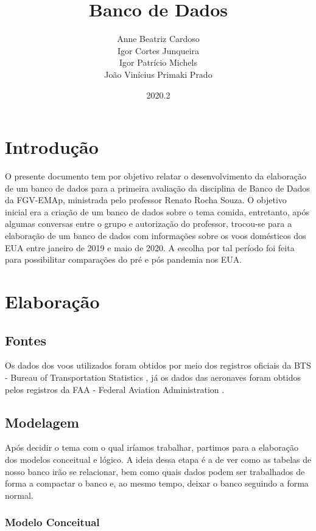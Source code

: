 \documentclass{article}
\title{Banco de Dados}
\author{Anne Beatriz Cardoso \\ Igor Cortes Junqueira \\ Igor Patrício Michels \\ João Vinícius Primaki Prado}
\date{2020.2}
\begin{document}
	
	\maketitle
	
	\section{Introdução}
	
	O presente documento tem por objetivo relatar o desenvolvimento da elaboração de um banco de dados para a primeira avaliação da disciplina de Banco de Dados da FGV-EMAp, ministrada pelo professor Renato Rocha Souza. O objetivo inicial era a criação de um banco de dados sobre o tema comida, entretanto, após algumas conversas entre o grupo e autorização do professor, trocou-se para a elaboração de um banco de dados com informações sobre os voos domésticos dos EUA entre janeiro de 2019 e maio de 2020. A escolha por tal período foi feita para possibilitar comparações do pré e pós pandemia nos EUA.
	
	\section{Elaboração}
	
	\subsection{Fontes}
	
	Os dados dos voos utilizados foram obtidos por meio dos registros oficiais da BTS - Bureau of Transportation Statistics \cite{BTS}, já os dados das aeronaves foram obtidos pelos registros da FAA - Federal Aviation Administration \cite{FAA}.
	
	\subsection{Modelagem}
	
	Após decidir o tema com o qual iríamos trabalhar, partimos para a elaboração dos modelos conceitual e lógico. A ideia dessa etapa é a de ver como as tabelas de nosso banco irão se relacionar, bem como quais dados podem ser trabalhados de forma a compactar o banco e, ao mesmo tempo, deixar o banco seguindo a forma normal.
	
	\subsubsection{Modelo Conceitual}
	
\end{document}
